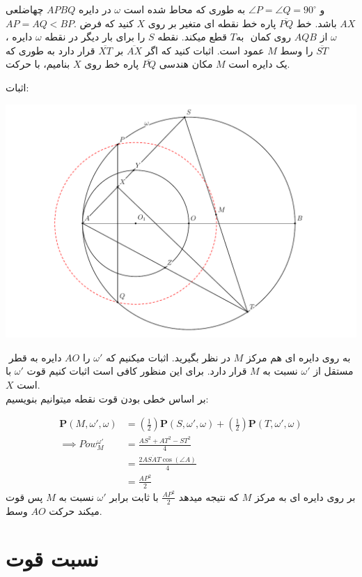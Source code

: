 \documentclass{article}
\begin{document}
\begin{exam}{}{}
چهاضلعی ‎‎$‎APBQ‎$‎ ‏در دایره ‎‎$‎\omega‎$‎ ‏محاط شده است ‎‎‏به طوری که ‎‎$‎\angle P=\angle ‎Q‎=90^\circ$‎‎‎‎ ‏و\\ ‎‎$‎AP=AQ<BP‎$‏. ‎فرض‎ کنید که ‎‎$‎X‎$‎‎‎‎ ‏نقطه ای متغیر بر روی ‎‎‏پاره خط ‎‎$‎‎\overline{PQ}‎‎$‎ ‏باشد. خط ‎‎$‎AX‎‎‏$‏،‎‎‎‎‎ دایره ‎‎$‎‎\omega‎‎$‎ ‏را برای بار دیگر در نقطه ‎‎$‎S‎$‎ ‏قطع میکند. نقطه ‎$‎‎‎T‎$‎‎‏ ‏به‎‎ روی کمان ‎‎‎$‎AQB‎$‎‎‎‎ ‏از ‎‎$‎‎\omega‎‎$‎ ‏قرار دارد به طوری که ‎‎$‎\overline{XT}‎$‎ ‏بر ‎‎$‎\overline{AX}‎$‎ ‏عمود است. اثبات کنید که اگر ‎‎$‎M‎$‎ ‏را وسط ‎‎$‎\overline{ST}‎$‎‎‎ ‏بنامیم‏، با حرکت ‎‎$‎X‎$‎ ‏روی ‎‏پاره خط ‎$\overline{PQ}‎$‎‎‎‎ ‏مکان هندسی ‎‎$‎M‎$‎ ‏یک دایره است‎.‎
\end{exam}
\newpage
اثبات:

\includegraphics[scale=0.6]{usa2015.pdf}

‎‎
دایره به قطر ‎‎$‎AO‎$‎ ‏را ‎$‎‎‎\omega'‎$‎ در نظر بگیرید. اثبات میکنیم که ‎‎$‎M‎$‎ ‏به روی دایره ای هم مرکز با ‎$‎‎\omega‎'‎$‎ ‏قرار دارد. برای این منظور کافی است اثبات کنیم قوت ‎‎$‎M‎$‎ نسبت به ‎‎$‎\omega'‎$‎ مستقل از ‎‎$‎X‎$‎ ‏است.
\\
بر اساس خطی بودن قوت نقطه میتوانیم بنویسیم:

\begin{align*}
    \mathbf{P}(M,\omega',\omega)&=(\frac12)\mathbf{P}(S,\omega',\omega)+(\frac12)\mathbf{P}(T,\omega',\omega)\\
    \implies Pow_M^{\omega'}&=\frac{AS^2+AT^2-ST^2}{4}\\
    &= \frac{2 AS \dot AT \cos{(\angle A)}}{4}\\
    &=\frac{AP^2}{2}
\end{align*}
پس قوت ‎$M‎$‎‎ ‏نسبت به ‎‎$‎\omega'‎$‎ برابر‎‎ با ثابت ‎‎$‎‎\frac{AP^2}{2}‎$‎‎ ‏که نتیجه میدهد ‎‎$‎M‎$‎ ‏بر روی دایره ای به مرکز وسط ‎‎$‎AO‎$ ‏‎حرکت‎ میکند.

\section{نسبت قوت}

\begin{theo}

\end{theo}
\end{document}
